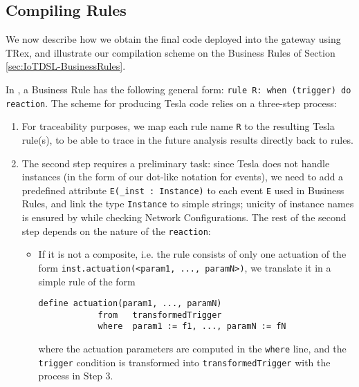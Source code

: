 \subsection{Compiling \IOTDSL Rules}
\label{sec:CG-Compilation}

We now describe how we obtain the final code deployed into the gateway using TRex, and illustrate our compilation scheme on the Business Rules of Section \ref{sec:IoTDSL-BusinessRules}.

In \IOTDSL, a Business Rule has the following general form: \lstinline[language=iotdsl]{rule R: when (trigger) do reaction}. The scheme for producing Tesla code relies on a three-step process:
\begin{enumerate}
	\item For traceability purposes, we map each rule name \lstinline[language=iotdsl]{R} to the resulting Tesla rule(s), to be able to trace in the future analysis results directly back to \IOTDSL rules.
	
	\item The second step requires a preliminary task: since Tesla does not handle instances (in the form of our dot-like notation for events), we need to add a predefined attribute \lstinline[language=tesla]{E(_inst : Instance)} to each event \lstinline[language=iotdsl]{E} used in \IOTDSL Business Rules, and link the type \lstinline[language=iotdsl]{Instance} to simple strings; unicity of instance names is ensured by \IOTDSL while checking Network Configurations. The rest of the second step depends on the nature of the \lstinline[language=iotdsl]{reaction}:
	\begin{itemize}
		\item If it is not a composite, i.e. the rule consists of only one actuation of the form \lstinline[language=iotdsl]{inst.actuation(<param1, ..., paramN>)}, we translate it in a simple rule of the form
		\begin{lstlisting}[language=tesla]
			define actuation(param1, ..., paramN)
			from   transformedTrigger
			where  param1 := f1, ..., paramN := fN
		\end{lstlisting}
		where the actuation parameters are computed in the \lstinline[language=tesla]{where} line, and the \lstinline[language=iotdsl]{trigger} condition is transformed into \lstinline[language=tesla]{transformedTrigger} with the process in Step 3.
		

\end{itemize}
\end{enumerate}
